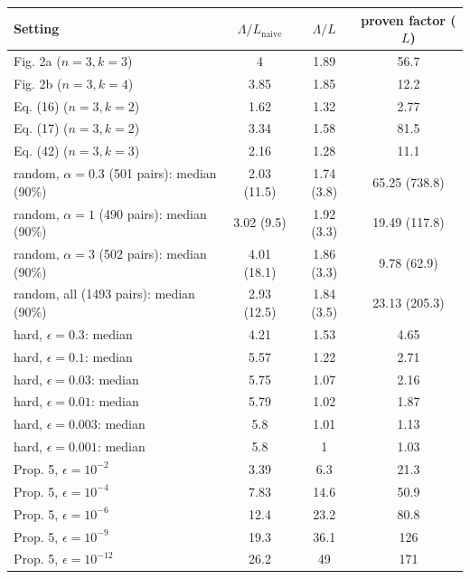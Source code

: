 \begin{tabular}{lccc}
\toprule
Setting & $\Lambda/L_{\mathrm{naive}}$ & $\Lambda/L$ & proven factor ($L$) \\
\midrule
Fig. 2a ($n=3, k=3$) & 4 & 1.89 & 56.7 \\
Fig. 2b ($n=3, k=4$) & 3.85 & 1.85 & 12.2 \\
Eq. (16) ($n=3, k=2$) & 1.62 & 1.32 & 2.77 \\
Eq. (17) ($n=3, k=2$) & 3.34 & 1.58 & 81.5 \\
Eq. (42) ($n=3, k=3$) & 2.16 & 1.28 & 11.1 \\
random, $\alpha=0.3$ (501 pairs): median (90\%) & 2.03 (11.5) & 1.74 (3.8) & 65.25 (738.8) \\
random, $\alpha=1$ (490 pairs): median (90\%) & 3.02 (9.5) & 1.92 (3.3) & 19.49 (117.8) \\
random, $\alpha=3$ (502 pairs): median (90\%) & 4.01 (18.1) & 1.86 (3.3) & 9.78 (62.9) \\
random, all (1493 pairs): median (90\%) & 2.93 (12.5) & 1.84 (3.5) & 23.13 (205.3) \\
hard, $\epsilon=0.3$: median & 4.21 & 1.53 & 4.65 \\
hard, $\epsilon=0.1$: median & 5.57 & 1.22 & 2.71 \\
hard, $\epsilon=0.03$: median & 5.75 & 1.07 & 2.16 \\
hard, $\epsilon=0.01$: median & 5.79 & 1.02 & 1.87 \\
hard, $\epsilon=0.003$: median & 5.8 & 1.01 & 1.13 \\
hard, $\epsilon=0.001$: median & 5.8 & 1 & 1.03 \\
Prop. 5, $\epsilon=10^{-2}$ & 3.39 & 6.3 & 21.3 \\
Prop. 5, $\epsilon=10^{-4}$ & 7.83 & 14.6 & 50.9 \\
Prop. 5, $\epsilon=10^{-6}$ & 12.4 & 23.2 & 80.8 \\
Prop. 5, $\epsilon=10^{-9}$ & 19.3 & 36.1 & 126 \\
Prop. 5, $\epsilon=10^{-12}$ & 26.2 & 49 & 171 \\
\bottomrule
\end{tabular}
